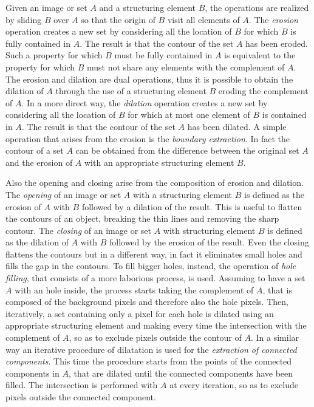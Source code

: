 \documentclass[final,a4paper,12pt,english]{UnicaPhdThesis3}
\begin{document}

Given an image or set $A$ and a structuring element $B$, the operations are realized by sliding $B$ over $A$ so that the origin of $B$ visit all elements of $A$. The \textit{erosion} operation creates a new set by considering all the location of $B$ for which $B$ is fully contained in $A$. The result is that the contour of the set $A$ has been eroded. Such a property for which $B$ must be fully contained in $A$ is equivalent to the property for which $B$ must not share any elements with the complement of $A$. The erosion and dilation are dual operations, thus it is possible to obtain the dilation of $A$ through the use of a structuring element $B$ eroding the complement of $A$. In a more direct way, the \textit{dilation} operation creates a new set by considering all the location of $B$ for which at most one element of $B$ is contained in $A$. The result is that the contour of the set $A$ has been dilated. A simple operation that arises from the erosion is the \textit{boundary extraction}. In fact the contour of a set $A$ can be obtained from the difference between the original set $A$ and the erosion of $A$ with an appropriate structuring element $B$.

Also the opening and closing arise from the composition of erosion and dilation. The \textit{opening} of an image or set $A$ with a structuring element $B$ is defined as the erosion of $A$ with $B$ followed by a dilation of the result. This is useful to flatten the contours of an object, breaking the thin lines and removing the sharp contour. The \textit{closing} of an image or set $A$ with structuring element $B$ is defined as the dilation of $A$ with $B$ followed by the erosion of the result. Even the closing flattens the contours but in a different way, in fact it eliminates small holes and fills the gap in the contours. To fill bigger holes, instead, the operation of \textit{hole filling}, that consists of a more laborious process, is used. Assuming to have a set $A$ with an hole inside, the process starts taking the complement of $A$, that is composed of the background pixels and therefore also the hole pixels. Then, iteratively, a set containing only a pixel for each hole is dilated using an appropriate structuring element and making every time the intersection with the complement of $A$, so as to exclude pixels outside the contour of $A$. In a similar way an iterative procedure of dilatation is used for the \textit{extraction of connected components}. This time the procedure starts from the points of the connected components in $A$, that are dilated until the connected components have been filled. The intersection is performed with $A$ at every iteration, so as to exclude pixels outside the connected component. 
\end{document}

